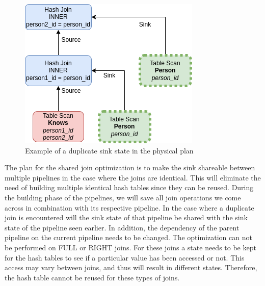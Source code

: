 \begin{figure}
  \includegraphics[width=0.6\linewidth]{figures/physicalplan-shared-hash-join.png}
  \caption{Example of a duplicate sink state in the physical plan}
  \label{fig:physicalplanhashjoin}
\end{figure}

The plan for the shared join optimization is to make the sink shareable between multiple pipelines in the case where the joins are identical. 
This will eliminate the need of building multiple identical hash tables since they can be reused. 
During the building phase of the pipelines, we will save all join operations we come across in combination with its respective pipeline. 
In the case where a duplicate join is encountered will the sink state of that pipeline be shared with the sink state of the pipeline seen earlier. 
In addition, the dependency of the parent pipeline on the current pipeline needs to be changed.
The optimization can not be performed on FULL or RIGHT joins. 
For these joins a state needs to be kept for the hash tables to see if a particular value has been accessed or not.
This access may vary between joins, and thus will result in different states. 
Therefore, the hash table cannot be reused for these types of joins. 





